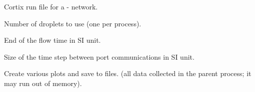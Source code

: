 \documentclass[letterpaper,10pt,openany,oneside,english]{sphinxmanual}
\begin{document}
\begin{fulllineitems}
\label{\detokenize{examples_rst/run_droplet_swirl:run_droplet_swirl.main}}
Cortix run file for a - network.

\begin{fulllineitems}
\label{\detokenize{examples_rst/run_droplet_swirl:run_droplet_swirl.n_droplets}}
 \textendash{} Number of droplets to use (one per process).

\end{fulllineitems}


\begin{fulllineitems}
\label{\detokenize{examples_rst/run_droplet_swirl:run_droplet_swirl.end_time}}
 \textendash{} End of the flow time in SI unit.

\end{fulllineitems}


\begin{fulllineitems}
\label{\detokenize{examples_rst/run_droplet_swirl:run_droplet_swirl.time_step}}
 \textendash{} Size of the time step between port communications in SI unit.

\end{fulllineitems}


\begin{fulllineitems}
\label{\detokenize{examples_rst/run_droplet_swirl:run_droplet_swirl.create_plots}}
 \textendash{} Create various plots and save to files. (all data collected in the
parent process; it may run out of memory).


\end{fulllineitems}
\end{fulllineitems}
\end{document}
